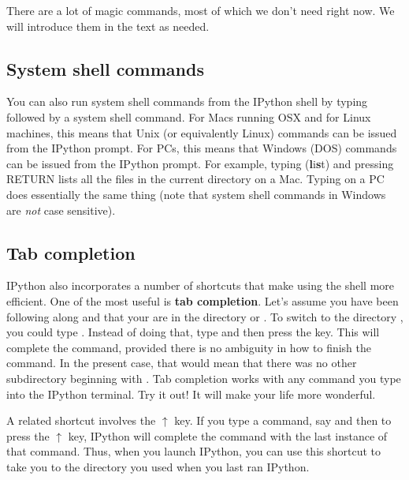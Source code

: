 \documentclass[letterpaper,10pt,english]{sphinxmanual}
\begin{document}
There are a lot of magic commands, most of which we don't need right now.  We will introduce them in the text as needed.


\subsection{System shell commands}
\label{chap2/chap2_basics:system-shell-commands}\label{chap2/chap2_basics:syscommands}
You can also run system shell commands from the IPython shell by typing \code{!} followed by a system shell command.  For Macs running OSX and for Linux machines, this means that Unix (or equivalently Linux) commands can be issued from the IPython prompt.  For PCs, this means that Windows (DOS) commands can be issued from the IPython prompt.  For example, typing   (\textbf{l}i\textbf{s}t) and pressing RETURN lists all the files in the current directory on a Mac.  Typing  on a PC does essentially the same thing (note that system shell commands in Windows are \emph{not} case sensitive).


\subsection{Tab completion}
\label{chap2/chap2_basics:tab-completion}\label{chap2/chap2_basics:index-8}
IPython also incorporates a number of shortcuts that make using the shell more efficient.  One of the most useful is \textbf{tab completion}.  Let's assume you have been following along and that your are in the directory   or .  To switch to the directory , you could type .  Instead of doing that, type  and then press the  key.  This will complete the command, provided there is no ambiguity in how to finish the command.  In the present case, that would mean that there was no other subdirectory beginning with .  Tab completion works with any command you type into the IPython terminal.  Try it out!  It will make your life more wonderful.

A related shortcut involves the $\uparrow$ key.  If you type a command, say  and then to press the $\uparrow$ key, IPython will complete the  command with the last instance of that command.  Thus, when you launch IPython, you can use this shortcut to take you to the directory you used when you last ran IPython.
\end{document}
